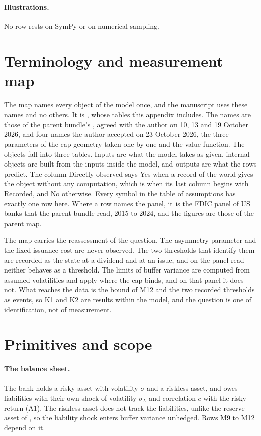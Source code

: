 \paragraph{Illustrations.} No row rests on SymPy or on numerical sampling.

\section{Terminology and measurement map}
\label{app:terms}

The map names every object of the model once, and the manuscript uses these
names and no others. It is , whose tables
this appendix includes. The names are those of the parent bundle's
, agreed with the author on 10, 13 and 19 October
2026, and four names the author accepted on 23 October 2026, the three
parameters of the cap geometry taken one by one and the value function. The objects fall into three
tables. Inputs are what the model takes as given, internal objects are built
from the inputs inside the model, and outputs are what the rows predict. The
column Directly observed says Yes when a record of the world gives the object
without any computation, which is when its last column begins with Recorded,
and No otherwise. Every symbol in the table of assumptions has exactly one row
here. Where a row names the panel, it is the FDIC panel of US banks that the
parent bundle read, 2015 to 2024, and the figures are those of the parent map.

The map carries the reassessment of the question. The asymmetry parameter and
the fixed issuance cost are never observed. The two thresholds that identify
them are recorded as the state at a dividend and at an issue, and on the panel
read neither behaves as a threshold. The limits of buffer variance are computed
from assumed volatilities and apply where the cap binds, and on that panel it
does not. What reaches the data is the bound of M12 and the two recorded
thresholds as events, so K1 and K2 are results within the model, and the
question is one of identification, not of measurement.



\section{Primitives and scope}
\label{app:scope}

\paragraph{The balance sheet.} The bank holds a risky asset with volatility
$\sigma$ and a riskless asset, and owes liabilities with their own shock of
volatility $\sigma_L$ and correlation $c$ with the risky return (A1). The
riskless asset does not track the liabilities, unlike the reserve asset of
\citet{blackperold1992}, so the liability shock enters buffer variance
unhedged. Rows M9 to M12 depend on it.

